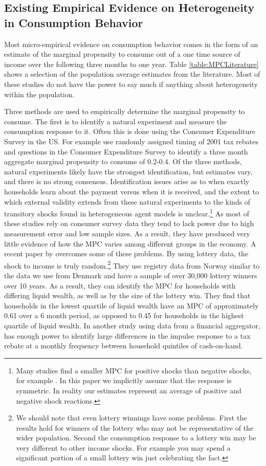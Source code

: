 \documentclass[titlepage]{\econtex}\newcommand{\texname}{ConsumptionHeterogeneity}
\begin{document}
\subsection{Existing Empirical Evidence on Heterogeneity in Consumption Behavior} \label{MPCEmpirics}
Most micro-empirical evidence on consumption behavior comes in the form of an estimate of the marginal propensity to consume out of a one time source of income over the following three months to one year. Table \ref{table:MPCLiterature} shows a selection of the population average estimates from the literature. Most of these studies do not have the power to say much if anything about heterogeneity within the population.

Three methods are used to empirically determine the marginal propensity to consume. The first is to identify a natural experiment and measure the consumption response to it. Often this is done using the Consumer Expenditure Survey in the US. For example \cite{johnson_household_2006} use randomly assigned timing of 2001 tax rebates and questions in the Consumer Expenditure Survey to identify a three month aggregate marginal propensity to consume of 0.2-0.4. Of the three methods, natural experiments likely have the strongest identification, but estimates vary, and there is no strong consensus. Identification issues arise as to when exactly households learn about the payment versus when it is received, and the extent to which external validity extends from these natural experiments to the kinds of transitory shocks found in heterogeneous agent models is unclear.\footnote{Many studies find a smaller MPC for positive shocks than negative shocks, for example \cite{bunn_consumption_2018}. In this paper we implicitly assume that the response is symmetric. In reality our estimates represent an average of positive and negative shock reactions.} As most of these studies rely on consumer survey data they tend to lack power due to high measurement error and low sample sizes. As a result, they have produced very little evidence of how the MPC varies among different groups in the economy. A recent paper by \cite{fagereng_mpc_2016} overcomes some of these problems. By using lottery data, the shock to income is truly random.\footnote{We should note that even lottery winnings have some problems. First the results hold for winners of the lottery who may not be representative of the wider population. Second the consumption response to a lottery win may be very different to other income shocks. For example you may spend a significant portion of a small lottery win just celebrating the fact.} They use registry data from Norway similar to the data we use from Denmark and have a sample of over 30,000 lottery winners over 10 years. As a result, they can identify the MPC for households with differing liquid wealth, as well as by the size of the lottery win. They find that households in the lowest quartile of liquid wealth have an MPC of approximately 0.61 over a 6 month period, as opposed to 0.45 for households in the highest quartile of liquid wealth. In another study using data from a financial aggregator, \cite{gelman_what_2016} has enough power to identify large differences in the impulse response to a tax rebate at a monthly frequency between household quintiles of cash-on-hand.
\end{document}
